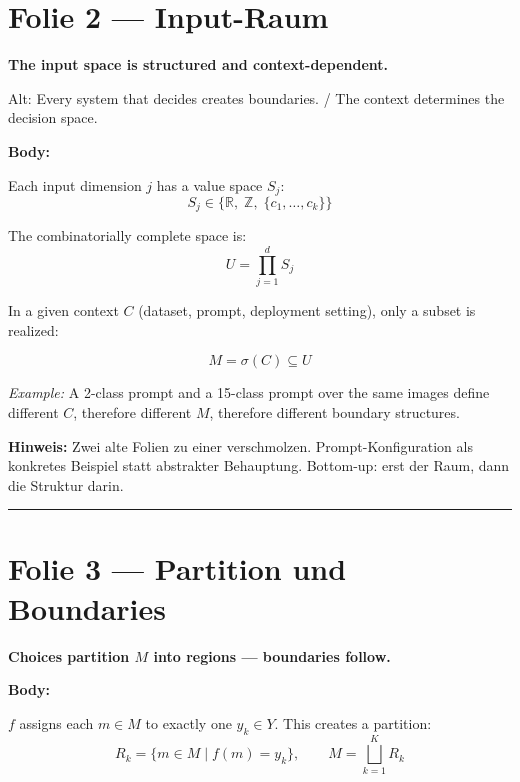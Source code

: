 \documentclass[11pt, a4paper]{article}
\newcommand{\actiontitle}[1]{{\Large\bfseries\color{tumdark} #1}\par\vspace{0.3em}}
\newcommand{\oldtitle}[1]{{\small\color{gray} Alt: #1}\par}
\newcommand{\slidenote}[1]{{\small\color{accent}\textbf{Hinweis:} #1}\par}
\begin{document}
\section*{Folie 2 --- Input-Raum}

\actiontitle{The input space is structured and context-dependent.}

\oldtitle{Every system that decides creates boundaries. / The context determines the decision space.}

\textbf{Body:}

Each input dimension $j$ has a value space $S_j$:
%
\begin{equation}
S_j \in \bigl\{\mathbb{R},\; \mathbb{Z},\; \{c_1, \ldots, c_k\}\bigr\}
\end{equation}

The combinatorially complete space is:
%
\begin{equation}
U = \prod_{j=1}^{d} S_j
\end{equation}

In a given context $C$ (dataset, prompt, deployment setting), only a subset is realized:
%
\begin{tcolorbox}[colframe=tumblue, colback=white]
\begin{equation}
M = \sigma(C) \subseteq U
\end{equation}
\end{tcolorbox}

\textit{Example:} A 2-class prompt and a 15-class prompt over the same images define different $C$, therefore different $M$, therefore different boundary structures.

\slidenote{Zwei alte Folien zu einer verschmolzen. Prompt-Konfiguration als konkretes Beispiel statt abstrakter Behauptung. Bottom-up: erst der Raum, dann die Struktur darin.}

\bigskip\hrule\bigskip

\section*{Folie 3 --- Partition und Boundaries}

\actiontitle{Choices partition $M$ into regions --- boundaries follow.}

\textbf{Body:}

$f$ assigns each $m \in M$ to exactly one $y_k \in Y$. This creates a partition:
%
\begin{equation}
R_k = \bigl\{m \in M \;\big|\; f(m) = y_k\bigr\}, \qquad M = \bigsqcup_{k=1}^{K} R_k
\end{equation}
\end{document}
